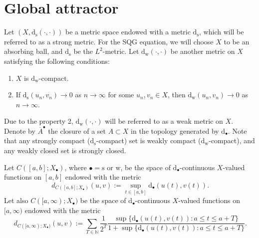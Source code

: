 \documentclass{amsart}
\newcommand{\ds}{\mathrm{d}_{\mathrm{s}}}
\newcommand{\dw}{\mathrm{d}_{\mathrm{w}}}
\newcommand{\Hw}{H_{\mathrm{w}}}
\newcommand{\db}{\mathrm{d}_{\bullet}}
\newcommand{\dd}{\,d}
\numberwithin{Theorem}{section}
\theoremstyle{definition}
\theoremstyle{remark}
\begin{document}

\bigskip


\section{Global attractor}
\label{sec:att}

Let $(X,\ds(\cdot,\cdot))$ be a metric space endowed with
a metric $\ds$, which will be referred to as a strong metric. For the SQG equation, we will choose $X$ to be an absorbing ball, and $\ds$ be
the $L^2$-metric. 
Let $\dw(\cdot, \cdot)$ be another metric on $X$ satisfying
the following conditions:
\begin{enumerate}
\item $X$ is $\dw$-compact.
\item If $\ds(u_n, v_n) \to 0$ as $n \to \infty$ for some
$u_n, v_n \in X$, then $\dw(u_n, v_n) \to 0$ as $n \to \infty$.
\end{enumerate}
Due to the property 2, $\dw(\cdot,\cdot)$ will be referred to as a weak metric on $X$. Denote by $\overline{A}^{\bullet}$ the closure of a set $A\subset X$
in the topology generated by $\db$.
Note that any strongly compact ($\ds$-compact) set is weakly compact
($\dw$-compact), and any weakly closed set is strongly closed.

Let $C([a, b];X_\bullet)$, where $\bullet = \mathrm{s}$ or $\mathrm{w}$, be the space of $\db$-continuous $X$-valued
functions on $[a, b]$ %
endowed with the metric
\[
\dd_{C([a, b];X_\bullet)}(u,v) := \sup_{t\in[a,b]}\db(u(t),v(t)). 
\]
Let also $C([a, \infty);X_\bullet)$ be the space of $\db$-continuous
$X$-valued functions on $[a, \infty)$
endowed with the metric
\[
\dd_{C([a, \infty);X_\bullet)}(u,v) := \sum_{T\in \mathbb{N}} \frac{1}{2^T} \frac{\sup\{\db(u(t),v(t)):a\leq t\leq a+T\}}
{1+\sup\{\db(u(t),v(t)):a\leq t\leq a+T\}}.
\]
\end{document}
